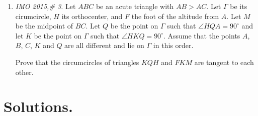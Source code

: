 \documentclass[11pt,a4paper]{article}
\begin{document}
\begin{enumerate}
\item\emph {IMO 2015,\# 3.} Let $ABC$ be an acute triangle with $AB > AC$. Let $\Gamma $ be its cirumcircle, $H$ its orthocenter, and $F$ the foot of the altitude from $A$. Let $M$ be the midpoint of $BC$. Let $Q$ be the point on $\Gamma$ such that $\angle HQA = 90^{\circ}$ and let $K$ be the point on $\Gamma$ such that $\angle HKQ = 90^{\circ}$. Assume that the points $A$, $B$, $C$, $K$ and $Q$ are all different and lie on $\Gamma$ in this order.

Prove that the circumcircles of triangles $KQH$ and $FKM$ are tangent to each other.

\end{enumerate}

\section {Solutions.}
\end{document}
